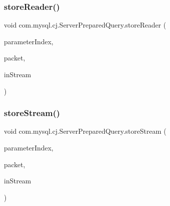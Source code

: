 \mbox{\label{classcom_1_1mysql_1_1cj_1_1_server_prepared_query_ac4ac18fbd9ce15ea67cb5bb4a04bf420}} 
\subsubsection{\texorpdfstring{store\+Reader()}{storeReader()}}
{\footnotesize\ttfamily void com.\+mysql.\+cj.\+Server\+Prepared\+Query.\+store\+Reader (\begin{DoxyParamCaption}\item[{int}]{parameter\+Index,  }\item[{\mbox{\hyperlink{classcom_1_1mysql_1_1cj_1_1protocol_1_1a_1_1_native_packet_payload}{Native\+Packet\+Payload}}}]{packet,  }\item[{Reader}]{in\+Stream }\end{DoxyParamCaption})}

\mbox{\label{classcom_1_1mysql_1_1cj_1_1_server_prepared_query_a056104958d556f856c15308012eae077}} 
\subsubsection{\texorpdfstring{store\+Stream()}{storeStream()}}
{\footnotesize\ttfamily void com.\+mysql.\+cj.\+Server\+Prepared\+Query.\+store\+Stream (\begin{DoxyParamCaption}\item[{int}]{parameter\+Index,  }\item[{\mbox{\hyperlink{classcom_1_1mysql_1_1cj_1_1protocol_1_1a_1_1_native_packet_payload}{Native\+Packet\+Payload}}}]{packet,  }\item[{Input\+Stream}]{in\+Stream }\end{DoxyParamCaption})}



